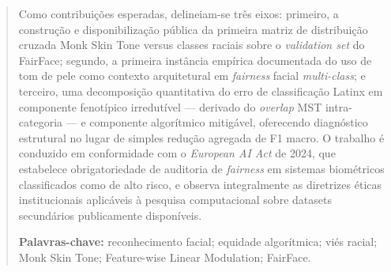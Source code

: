 \begin{abstract}
\noindent Como contribuições esperadas, delineiam-se três eixos: primeiro, a construção e disponibilização pública da primeira matriz de distribuição cruzada Monk Skin Tone versus classes raciais sobre o \emph{validation set} do FairFace; segundo, a primeira instância empírica documentada do uso de tom de pele como contexto arquitetural em \emph{fairness} facial \emph{multi-class}; e terceiro, uma decomposição quantitativa do erro de classificação Latinx em componente fenotípico irredutível --- derivado do \emph{overlap} MST intra-categoria --- e componente algorítmico mitigável, oferecendo diagnóstico estrutural no lugar de simples redução agregada de F1 macro. O trabalho é conduzido em conformidade com o \emph{European AI Act} de 2024, que estabelece obrigatoriedade de auditoria de \emph{fairness} em sistemas biométricos classificados como de alto risco, e observa integralmente as diretrizes éticas institucionais aplicáveis à pesquisa computacional sobre datasets secundários publicamente disponíveis.

\medskip
\noindent\textbf{Palavras-chave:} reconhecimento facial; equidade algorítmica; viés racial; Monk Skin Tone; Feature-wise Linear Modulation; FairFace.
\end{abstract}

\vspace{1em}

\begin{abstract}
\end{abstract}

\newpage
